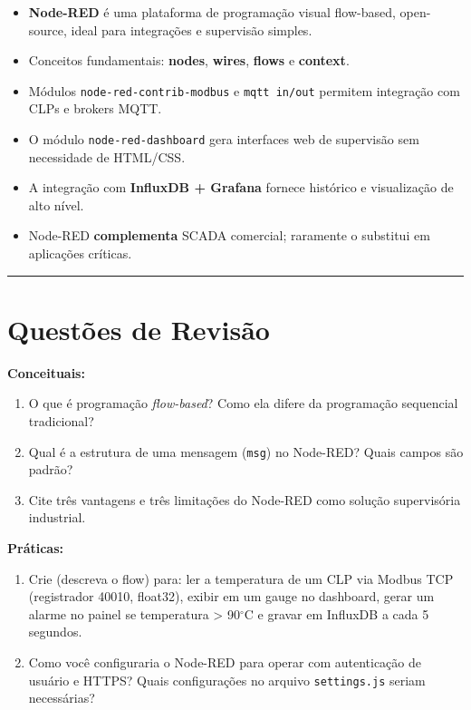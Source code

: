 \begin{itemize}
\tightlist
\item
  \textbf{Node-RED} é uma plataforma de programação visual flow-based, open-source, ideal para integrações e supervisão simples.
\item
  Conceitos fundamentais: \textbf{nodes}, \textbf{wires}, \textbf{flows} e \textbf{context}.
\item
  Módulos \passthrough{\lstinline!node-red-contrib-modbus!} e \passthrough{\lstinline!mqtt in/out!} permitem integração com CLPs e brokers MQTT.
\item
  O módulo \passthrough{\lstinline!node-red-dashboard!} gera interfaces web de supervisão sem necessidade de HTML/CSS.
\item
  A integração com \textbf{InfluxDB + Grafana} fornece histórico e visualização de alto nível.
\item
  Node-RED \textbf{complementa} SCADA comercial; raramente o substitui em aplicações críticas.
\end{itemize}

\begin{center}\rule{0.5\linewidth}{0.5pt}\end{center}

\section{Questões de Revisão}\label{questuxf5es-de-revisuxe3o}

\textbf{Conceituais:}

\begin{enumerate}
\def\labelenumi{\arabic{enumi}.}
\tightlist
\item
  O que é programação \emph{flow-based}? Como ela difere da programação sequencial tradicional?
\item
  Qual é a estrutura de uma mensagem (\passthrough{\lstinline!msg!}) no Node-RED? Quais campos são padrão?
\item
  Cite três vantagens e três limitações do Node-RED como solução supervisória industrial.
\end{enumerate}

\textbf{Práticas:}

\begin{enumerate}
\def\labelenumi{\arabic{enumi}.}
\setcounter{enumi}{3}
\tightlist
\item
  Crie (descreva o flow) para: ler a temperatura de um CLP via Modbus TCP (registrador 40010, float32), exibir em um gauge no dashboard, gerar um alarme no painel se temperatura \textgreater{} 90\ensuremath{^\circ}C e gravar em InfluxDB a cada 5 segundos.
\item
  Como você configuraria o Node-RED para operar com autenticação de usuário e HTTPS? Quais configurações no arquivo \passthrough{\lstinline!settings.js!} seriam necessárias?
\end{enumerate}

